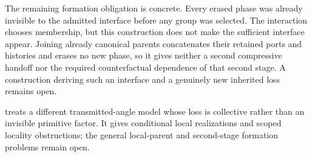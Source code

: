 The remaining formation obligation is concrete. Every erased phase was already invisible to the admitted interface before any group was selected. The interaction chooses membership, but this construction does not make the sufficient interface appear. Joining already canonical parents concatenates their retained ports and histories and erases no new phase, so it gives neither a second compressive handoff nor the required counterfactual dependence of that second stage. A construction deriving such an interface and a genuinely new inherited loss remains open.

 treats a different transmitted-angle model whose loss is collective rather than an invisible primitive factor. It gives conditional local realizations and scoped locality obstructions; the general local-parent and second-stage formation problems remain open.
